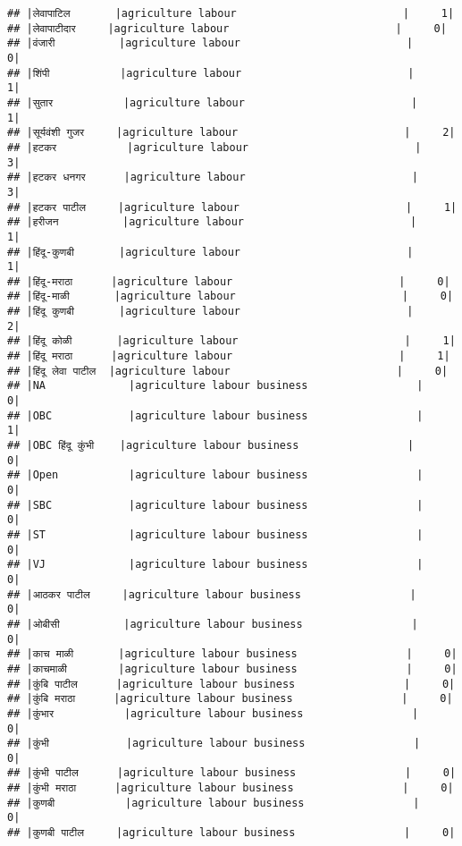 \documentclass[
]{article}
\begin{document}
\begin{verbatim}
## |लेवापाटिल       |agriculture labour                          |     1|
## |लेवापाटीदार     |agriculture labour                          |     0|
## |वंजारी          |agriculture labour                          |     0|
## |शिंपी           |agriculture labour                          |     1|
## |सुतार           |agriculture labour                          |     1|
## |सूर्यवंशी गुजर     |agriculture labour                          |     2|
## |हटकर           |agriculture labour                          |     3|
## |हटकर धनगर      |agriculture labour                          |     3|
## |हटकर पाटील     |agriculture labour                          |     1|
## |हरीजन          |agriculture labour                          |     1|
## |हिंदू-कुणबी       |agriculture labour                          |     1|
## |हिंदू-मराठा      |agriculture labour                          |     0|
## |हिंदू-माळी       |agriculture labour                          |     0|
## |हिंदू कुणबी       |agriculture labour                          |     2|
## |हिंदू कोळी       |agriculture labour                          |     1|
## |हिंदू मराठा      |agriculture labour                          |     1|
## |हिंदू लेवा पाटील  |agriculture labour                          |     0|
## |NA             |agriculture labour business                 |     0|
## |OBC            |agriculture labour business                 |     1|
## |OBC हिंदू कुंभी    |agriculture labour business                 |     0|
## |Open           |agriculture labour business                 |     0|
## |SBC            |agriculture labour business                 |     0|
## |ST             |agriculture labour business                 |     0|
## |VJ             |agriculture labour business                 |     0|
## |आठकर पाटील     |agriculture labour business                 |     0|
## |ओबीसी          |agriculture labour business                 |     0|
## |काच माळी       |agriculture labour business                 |     0|
## |काचमाळी        |agriculture labour business                 |     0|
## |कुंबि पाटील      |agriculture labour business                 |     0|
## |कुंबि मराठा      |agriculture labour business                 |     0|
## |कुंभार           |agriculture labour business                 |     0|
## |कुंभी            |agriculture labour business                 |     0|
## |कुंभी पाटील      |agriculture labour business                 |     0|
## |कुंभी मराठा      |agriculture labour business                 |     0|
## |कुणबी           |agriculture labour business                 |     0|
## |कुणबी पाटील     |agriculture labour business                 |     0|

\end{verbatim}
\end{document}
